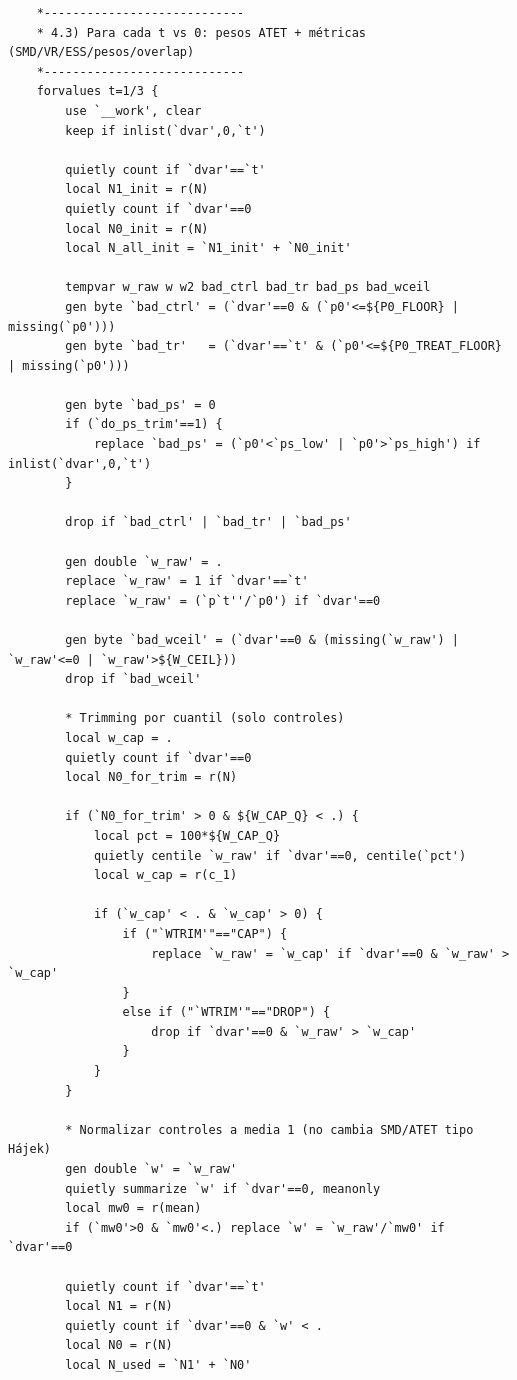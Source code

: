 \documentclass[12pt]{article}
\begin{document}
\begin{lstlisting}
    *----------------------------
    * 4.3) Para cada t vs 0: pesos ATET + métricas (SMD/VR/ESS/pesos/overlap)
    *----------------------------
    forvalues t=1/3 {
        use `__work', clear
        keep if inlist(`dvar',0,`t')

        quietly count if `dvar'==`t'
        local N1_init = r(N)
        quietly count if `dvar'==0
        local N0_init = r(N)
        local N_all_init = `N1_init' + `N0_init'

        tempvar w_raw w w2 bad_ctrl bad_tr bad_ps bad_wceil
        gen byte `bad_ctrl' = (`dvar'==0 & (`p0'<=${P0_FLOOR} | missing(`p0')))
        gen byte `bad_tr'   = (`dvar'==`t' & (`p0'<=${P0_TREAT_FLOOR} | missing(`p0')))

        gen byte `bad_ps' = 0
        if (`do_ps_trim'==1) {
            replace `bad_ps' = (`p0'<`ps_low' | `p0'>`ps_high') if inlist(`dvar',0,`t')
        }

        drop if `bad_ctrl' | `bad_tr' | `bad_ps'

        gen double `w_raw' = .
        replace `w_raw' = 1 if `dvar'==`t'
        replace `w_raw' = (`p`t''/`p0') if `dvar'==0

        gen byte `bad_wceil' = (`dvar'==0 & (missing(`w_raw') | `w_raw'<=0 | `w_raw'>${W_CEIL}))
        drop if `bad_wceil'

        * Trimming por cuantil (solo controles)
        local w_cap = .
        quietly count if `dvar'==0
        local N0_for_trim = r(N)

        if (`N0_for_trim' > 0 & ${W_CAP_Q} < .) {
            local pct = 100*${W_CAP_Q}
            quietly centile `w_raw' if `dvar'==0, centile(`pct')
            local w_cap = r(c_1)

            if (`w_cap' < . & `w_cap' > 0) {
                if ("`WTRIM'"=="CAP") {
                    replace `w_raw' = `w_cap' if `dvar'==0 & `w_raw' > `w_cap'
                }
                else if ("`WTRIM'"=="DROP") {
                    drop if `dvar'==0 & `w_raw' > `w_cap'
                }
            }
        }

        * Normalizar controles a media 1 (no cambia SMD/ATET tipo Hájek)
        gen double `w' = `w_raw'
        quietly summarize `w' if `dvar'==0, meanonly
        local mw0 = r(mean)
        if (`mw0'>0 & `mw0'<.) replace `w' = `w_raw'/`mw0' if `dvar'==0

        quietly count if `dvar'==`t'
        local N1 = r(N)
        quietly count if `dvar'==0 & `w' < .
        local N0 = r(N)
        local N_used = `N1' + `N0'


\end{lstlisting}
\end{document}
